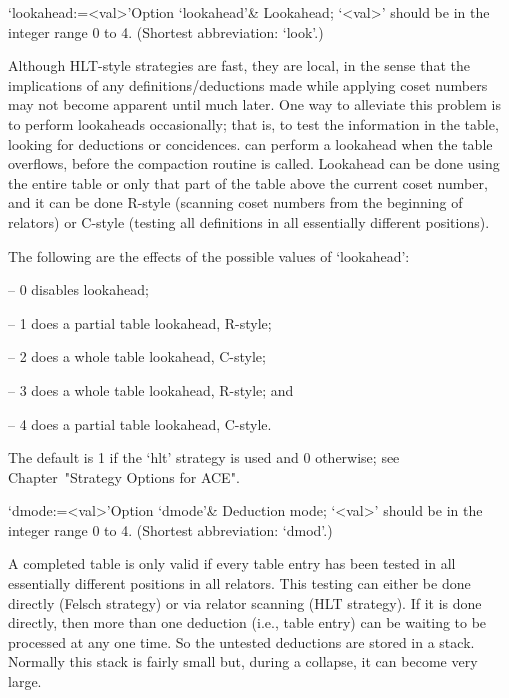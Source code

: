 \>`lookahead:=<val>'{Option `lookahead'}&
Lookahead; `<val>' should be in the integer range 0 to 4.
(Shortest abbreviation: `look'.)
  
Although HLT-style strategies are fast, they are local, in  the  sense
that  the  implications  of  any  definitions/deductions  made   while
applying coset numbers may not become apparent until much  later.  One
way to alleviate this problem is to perform  lookaheads  occasionally;
that is, to test the information in the table, looking for  deductions
or  concidences.  {\ACE}  can  perform  a  lookahead  when  the  table
overflows, before the compaction routine is called. Lookahead  can  be
done using the entire table or only that part of the table  above  the
current coset number, and it  can  be  done  R-style  (scanning  coset
numbers from the  beginning  of  relators)  or  C-style  (testing  all
definitions in all essentially different positions).

The following are the effects of the possible values of `lookahead':

\beginlist

\item{--} 0 disables lookahead;
\item{--} 1 does a partial table lookahead, R-style; 
\item{--} 2 does a whole table lookahead, C-style; 
\item{--} 3 does a whole table lookahead, R-style; and
\item{--} 4 does a partial table lookahead, C-style.  

\endlist

The default is 1 if the `hlt' strategy is used and  0  otherwise;  see
Chapter~"Strategy Options for ACE".

\enditems


\beginitems

\>`dmode:=<val>'{Option `dmode'}&
Deduction mode; `<val>' should be in the integer range 0 to 4.
(Shortest abbreviation: `dmod'.)

A completed table  is only valid if every table  entry has been tested
in all essentially different  positions in all relators.  This testing
can either be done directly  (Felsch strategy) or via relator scanning
(HLT strategy).  If it is  done directly, then more than one deduction
(i.e., table  entry) can be waiting  to be processed at  any one time.
So the untested deductions are stored in a stack.  Normally this stack
is fairly small but, during a collapse, it can become very large.

